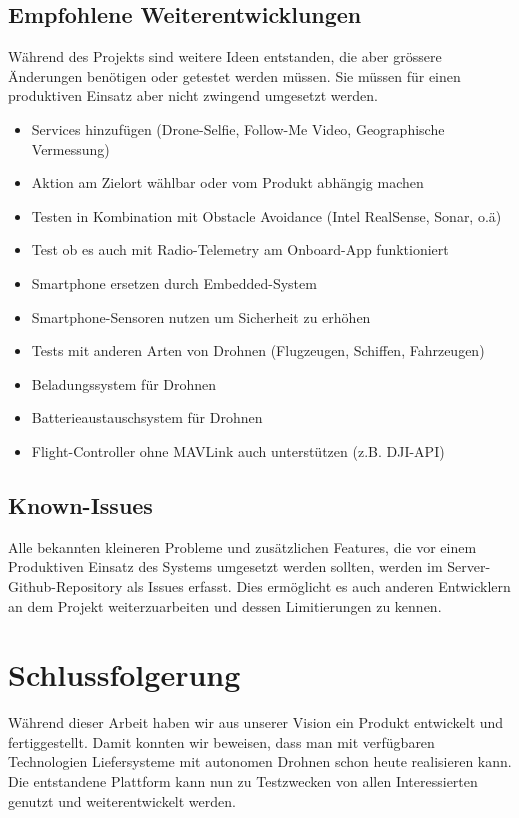 \subsection{Empfohlene Weiterentwicklungen}

Während des Projekts sind weitere Ideen entstanden, die aber grössere Änderungen benötigen oder getestet werden müssen. Sie müssen für einen produktiven Einsatz aber nicht zwingend umgesetzt werden.

\begin{itemize}
	\item Services hinzufügen (Drone-Selfie, Follow-Me Video, Geographische Vermessung)
	\item Aktion am Zielort wählbar oder vom Produkt abhängig machen
	\item Testen in Kombination mit Obstacle Avoidance (Intel RealSense, Sonar, o.ä)
	\item Test ob es auch mit Radio-Telemetry am Onboard-App funktioniert
	\item Smartphone ersetzen durch Embedded-System 
	\item Smartphone-Sensoren nutzen um Sicherheit zu erhöhen
	\item Tests mit anderen Arten von Drohnen (Flugzeugen, Schiffen, Fahrzeugen)
	\item Beladungssystem für Drohnen
	\item Batterieaustauschsystem für Drohnen
	\item Flight-Controller ohne MAVLink auch unterstützen (z.B. DJI-API)
\end{itemize} 


\subsection{Known-Issues}

Alle bekannten kleineren Probleme und zusätzlichen Features, die vor einem Produktiven Einsatz des Systems umgesetzt werden sollten, werden im Server-Github-Repository als Issues erfasst. Dies ermöglicht es auch anderen Entwicklern an dem Projekt weiterzuarbeiten und dessen Limitierungen zu kennen.


\section{Schlussfolgerung}

Während dieser Arbeit haben wir aus unserer Vision ein Produkt entwickelt und fertiggestellt. Damit konnten wir beweisen, dass man mit verfügbaren Technologien Liefersysteme mit autonomen Drohnen schon heute realisieren kann. Die entstandene Plattform kann nun zu Testzwecken von allen Interessierten genutzt und weiterentwickelt werden.\\

